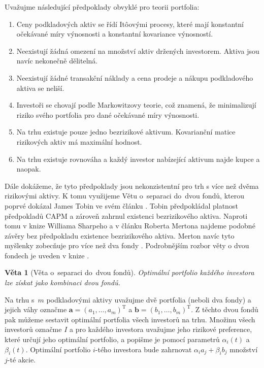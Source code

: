 \documentclass[a4paper,12pt]{report}
\newtheorem{veta}{Věta}
\theoremstyle{definition} \newtheorem{definice}[veta]{Definice}
\theoremstyle{remark}
\begin{document}
Uvažujme následující předpoklady obvyklé pro teorii portfolia:
\begin{enumerate}
\item \label{predpoklad_konstantnosti_vynosu_a_rizika} Ceny podkladových aktiv se řídí It\^oovými procesy, které mají konstantní očekávané míry výnosnosti a konstantní kovariance výnosností. 
\item Neexistují žádná omezení na množství aktiv držených investorem. Aktiva jsou navíc nekonečně dělitelná.
\item Neexistují žádné transakční náklady a cena prodeje a nákupu podkladového aktiva se neliší.
\item Investoři se chovají podle Markowitzovy teorie, což znamená, že minimalizují riziko svého portfolia pro dané očekávané míry výnosnosti.
\item \label{predpoklad_hodnost} Na trhu existuje pouze jedno bezrizikové aktivum. Kovarianční matice rizikových aktiv má maximální hodnost.
\item \label{predpoklad_konstantnosti_N} Na trhu existuje rovnováha a každý investor nabízející aktivum najde kupce a naopak.
\end{enumerate}

Dále dokážeme, že tyto předpoklady jsou nekonzistentní pro trh s více než dvěma rizikovými aktivy.
K tomu využijeme Větu o~separaci do~dvou fondů, kterou poprvé dokázal  James Tobin ve svém článku \cite{tobin}. 
Tobin předpokládal platnost předpokladů CAPM a zároveň zahrnul existenci bezrizikového aktiva.
Naproti tomu v knize Williama Sharpeho \cite{sharpe} a v článku Roberta Mertona \cite{merton} najdeme podobné závěry bez předpokladu existence bezrizikového aktiva.
Merton navíc tyto myšlenky zobecňuje pro více než dva fondy \cite{merton1973}.
Podrobnějším rozbor věty o dvou fondech je uveden v knize \cite{cass1970structure}.
\begin{veta}[Věta o~separaci do~dvou fondů]
Optimální portfolio každého investora lze získat jako kombinaci dvou fondů.
\end{veta}

Na trhu s~$m$ podkladovými aktivy uvažujme dvě portfolia (neboli dva fondy) a jejich váhy označme $\boldsymbol{a}=(a_1,\dots,a_m)^\mathrm{T}$ a $\boldsymbol{b}=(b_1,\dots,b_m)^\mathrm{T}$. Z těchto dvou fondů pak můžeme sestavit optimální portfolia všech investorů na trhu.
Množinu všech investorů označme $I$ a pro každého investora uvažujme jeho rizikové preference, které určují jeho optimální portfolio, a popišme je pomocí parametrů $\alpha_i(t)$ a $\beta_i(t)$.
Optimální portfolio $i$-tého investora bude zahrnovat $\alpha_ia_j+\beta_ib_j$ množství $j$-té akcie.
\end{document}
